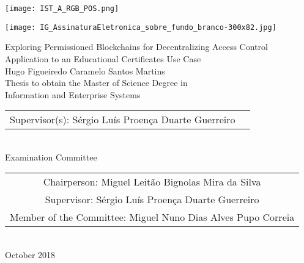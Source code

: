 \texttt{[image: IST\_A\_RGB\_POS.png]}

\hspace*{9.5cm}\texttt{[image: IG\_AssinaturaEletronica\_sobre\_fundo\_branco-300x82.jpg]}

\begin{center}
    \vspace{2.5cm}

    \vspace{1.5cm}
    {\FontLb Exploring Permissioned Blockchains for Decentralizing Access Control} \\
    \vspace{0.3cm}
    {\FontMn Application to an Educational Certificates Use Case} \\
    \vspace{1.5cm}  
    {\FontMb Hugo Figueiredo Caramelo Santos Martins} \\
    \vspace{1.5cm}
    {\FontSn Thesis to obtain the Master of Science Degree in} \\
    \vspace{0.3cm}
    {\FontLb Information and Enterprise Systems} \\
    \vspace{1.5cm}
    {\FontSn %
        \begin{tabular}{ll}
            Supervisor(s): Sérgio Luís Proença Duarte Guerreiro
        \end{tabular} } \\
    \vspace{1.5cm}
    {\FontMb Examination Committee} \\
    \vspace{0.3cm}
    {\FontSn %
        \begin{tabular}{c}
            Chairperson: Miguel Leitão Bignolas Mira da Silva  \\ 
            Supervisor: Sérgio Luís Proença Duarte Guerreiro \\ 
            Member of the Committee: Miguel Nuno Dias Alves Pupo Correia
        \end{tabular} } \\
    \vspace*{\fill}
    {\FontMb October 2018}
\end{center}